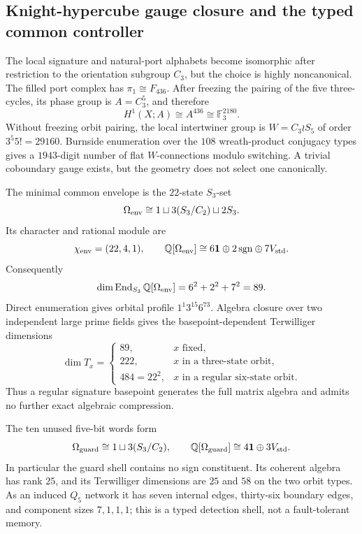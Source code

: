 \subsection{Knight-hypercube gauge closure and the typed common controller}

The local signature and natural-port alphabets become isomorphic after restriction
to the orientation subgroup $C_3$, but the choice is highly noncanonical.  The
filled port complex has $\pi_1\cong F_{436}$.  After freezing the pairing of the
five three-cycles, its phase group is $A=C_3^5$, and therefore
\[
H^1(X;A)\cong A^{436}\cong\mathbb F_3^{2180}.
\]
Without freezing orbit pairing, the local intertwiner group is
$W=C_3\wr S_5$ of order $3^5 5!=29160$.  Burnside enumeration over the
$108$ wreath-product conjugacy types gives a $1943$-digit number of flat
$W$-connections modulo switching.  A trivial coboundary gauge exists, but the
geometry does not select one canonically.

The minimal common envelope is the $22$-state $S_3$-set
\[
\Omega_{\rm env}\cong 1\sqcup3(S_3/C_2)\sqcup2S_3.
\]
Its character and rational module are
\[
\chi_{\rm env}=(22,4,1),\qquad
\mathbb Q[\Omega_{\rm env}]
\cong6\mathbf1\oplus2\,\mathrm{sgn}\oplus7V_{\rm std}.
\]
Consequently
\[
\dim\operatorname{End}_{S_3}\mathbb Q[\Omega_{\rm env}]
=6^2+2^2+7^2=89.
\]
Direct enumeration gives orbital profile $1^1 3^{15}6^{73}$.  Algebra closure
over two independent large prime fields gives the basepoint-dependent
Terwilliger dimensions
\[
\dim T_x=
\begin{cases}
89,&x\text{ fixed},\\
222,&x\text{ in a three-state orbit},\\
484=22^2,&x\text{ in a regular six-state orbit}.
\end{cases}
\]
Thus a regular signature basepoint generates the full matrix algebra and admits
no further exact algebraic compression.

The ten unused five-bit words form
\[
\Omega_{\rm guard}\cong1\sqcup3(S_3/C_2),
\qquad
\mathbb Q[\Omega_{\rm guard}]
\cong4\mathbf1\oplus3V_{\rm std}.
\]
In particular the guard shell contains no sign constituent.  Its coherent
algebra has rank $25$, and its Terwilliger dimensions are $25$ and $58$ on the
two orbit types.  As an induced $Q_5$ network it has seven internal edges,
thirty-six boundary edges, and component sizes $7,1,1,1$; this is a typed
detection shell, not a fault-tolerant memory.

